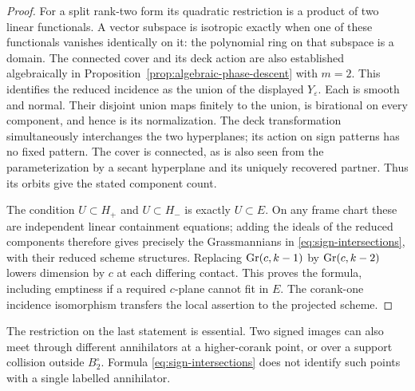 \begin{proof}
For a split rank-two form its quadratic restriction is a product of two
linear functionals. A vector subspace is isotropic exactly when one of
these functionals vanishes identically on it: the polynomial ring on
that subspace is a domain. The connected cover and its deck action are also established
algebraically in Proposition~\ref{prop:algebraic-phase-descent} with $m=2$.
This identifies the reduced incidence as the
union of the displayed $Y_\varepsilon$. Each is smooth and normal.
Their disjoint union maps finitely to the union, is birational on every
component, and hence is its normalization. The deck transformation
simultaneously interchanges the two hyperplanes; its action on sign
patterns has no fixed pattern. The cover is connected, as is also seen
from the parameterization by a secant hyperplane and its uniquely
recovered partner. Thus its orbits give the stated component count.

The condition $U\subset H_+$ and $U\subset H_-$ is exactly
$U\subset E$. On any frame chart these are independent linear
containment equations; adding the ideals of the reduced components
therefore gives precisely the Grassmannians in
\eqref{eq:sign-intersections}, with their reduced scheme structures.
Replacing $\operatorname{Gr}(c,k-1)$ by $\operatorname{Gr}(c,k-2)$ lowers dimension by $c$ at
each differing contact. This proves the formula, including emptiness
if a required $c$-plane cannot fit in $E$. The corank-one incidence
isomorphism transfers the local assertion to the projected scheme.
\end{proof}
The restriction on the last statement is essential. Two signed images
can also meet through different annihilators at a higher-corank point,
or over a support collision outside $B_2^\circ$. Formula
\eqref{eq:sign-intersections} does not identify such points with a
single labelled annihilator.

